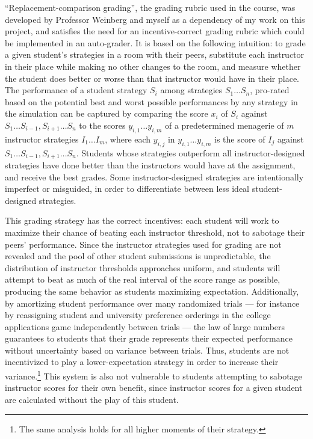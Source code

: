 \documentclass[pageno]{jpaper}
\begin{document}
``Replacement-comparison grading'', the grading rubric used in the course, was developed by Professor Weinberg and myself as a dependency of my work on this project, and satisfies the need for an incentive-correct grading rubric which could be implemented in an auto-grader.
It is based on the following intuition: to grade a given student's strategies in a room with their peers, substitute each instructor in their place while making no other changes to the room, and measure whether the student does better or worse than that instructor would have in their place.
The performance of a student strategy $S_i$ among strategies $S_1 \ldots S_n$, pro-rated based on the potential best and worst possible performances by any strategy in the simulation can be captured by comparing the score $x_i$ of $S_i$ against $S_1 \ldots S_{i-1}, S_{i+1} \ldots S_n$ to the scores $y_{i,1} \ldots y_{i,m}$ of a predetermined menagerie of $m$ instructor strategies $I_1 \ldots I_m$, where each $y_{i,j}$ in $y_{i,1} \ldots y_{i,m}$ is the score of $I_j$ against $S_1 \ldots S_{i-1}, S_{i+1} \ldots S_n$.
Students whose strategies outperform all instructor-designed strategies have done better than the instructors would have at the assignment, and receive the best grades.
Some instructor-designed strategies are intentionally imperfect or misguided, in order to differentiate between less ideal student-designed strategies.

This grading strategy has the correct incentives: each student will work to maximize their chance of beating each instructor threshold, not to sabotage their peers' performance.
Since the instructor strategies used for grading are not revealed and the pool of other student submissions is unpredictable, the distribution of instructor thresholds approaches uniform, and students will attempt to beat as much of the real interval of the score range as possible, producing the same behavior as students maximizing expectation.
Additionally, by amortizing student performance over many randomized trials --- for instance by reassigning student and university preference orderings in the college applications game independently between trials --- the law of large numbers guarantees to students that their grade represents their expected performance without uncertainty based on variance between trials.
Thus, students are not incentivized to play a lower-expectation strategy in order to increase their variance.\footnote{The same analysis holds for all higher moments of their strategy.}
This system is also not vulnerable to students attempting to sabotage instructor scores for their own benefit, since instructor scores for a given student are calculated without the play of this student.
\end{document}
